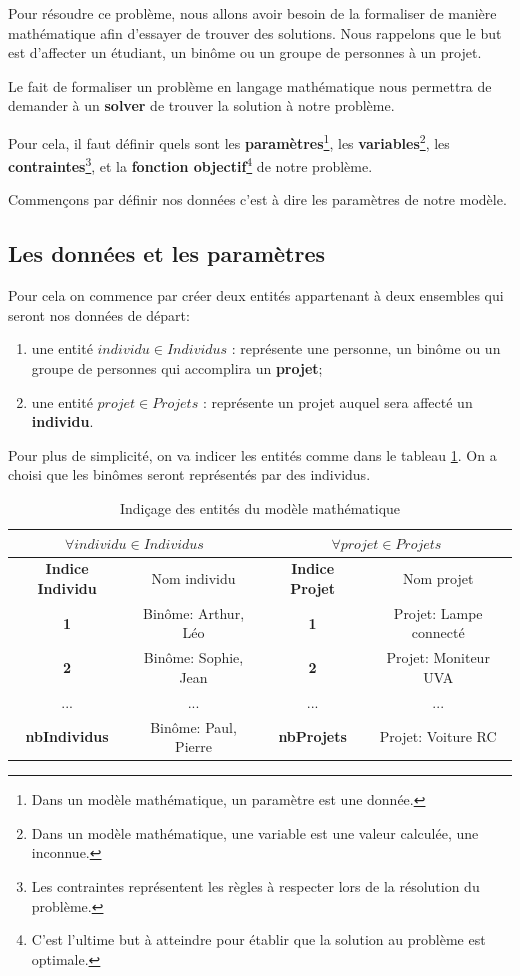 \documentclass{polytech/polytech}
\begin{document}
Pour résoudre ce problème, nous allons avoir besoin de la formaliser de manière mathématique afin d'essayer de trouver des solutions.
Nous rappelons que le but est d'affecter un étudiant, un binôme ou un groupe de personnes à un projet.

Le fait de formaliser un problème en langage mathématique nous permettra de demander à un \textbf{solver} de trouver la solution à notre problème.

Pour cela, il faut définir quels sont les \textbf{paramètres}\footnote{Dans un modèle mathématique, un paramètre est une donnée.}, les \textbf{ variables}\footnote{Dans un modèle mathématique, une variable est une valeur calculée, une inconnue.}, les \textbf{contraintes}\footnote{Les contraintes représentent les règles à respecter lors de la résolution du problème.}, et la \textbf{fonction objectif}\footnote{C'est l'ultime but à atteindre pour établir que la solution au problème est optimale.} de notre problème.

Commençons par définir nos données c'est à dire les paramètres de notre modèle.

\subsection{Les données et les paramètres}
\label{sec:donnees_params}
Pour cela on commence par créer deux entités appartenant à deux ensembles qui seront nos données de départ:
\begin{enumerate}
\item une entité $individu \in Individus$ : représente une personne, un binôme ou un groupe de personnes qui accomplira un \textbf{projet};
\item une entité  $projet \in Projets$ : représente un projet auquel sera affecté un \textbf{individu}.
\end{enumerate}

Pour plus de simplicité, on va indicer les entités comme dans le tableau \ref{tab:indice_entite_mod_math}. On a choisi que les binômes seront représentés par des individus.
\begin{table}
\caption{\label{tab:indice_entite_mod_math}Indiçage des entités du modèle mathématique}
\begin{tabular}{|c|c|c|c|}
\hline
\multicolumn{2}{|c|}{$\forall individu \in Individus$} & \multicolumn{2}{|c|}{$\forall projet \in Projets$} \\
\hline
\textbf{Indice Individu} & Nom individu &\textbf{ Indice Projet} & Nom projet \\
\hline
\textbf{1} & Binôme: Arthur, Léo & \textbf{1} & Projet: Lampe connecté \\
\hline
\textbf{2} & Binôme: Sophie, Jean & \textbf{2} & Projet: Moniteur UVA \\
\hline
... & ... & ... & ... \\
\hline
\textbf{nbIndividus} & Binôme: Paul, Pierre &\textbf{ nbProjets} & Projet: Voiture RC \\
\hline
\end{tabular}
\end{table}
\end{document}
